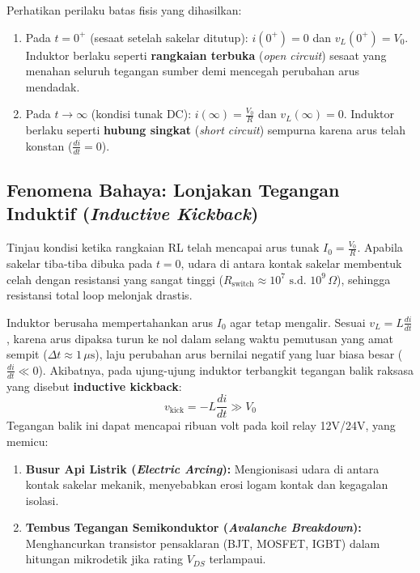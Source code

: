\documentclass[11pt,a4paper]{article}
\theoremstyle{definition}
\begin{document}
Perhatikan perilaku batas fisis yang dihasilkan:
\begin{enumerate}[leftmargin=*]
    \item Pada $t = 0^+$ (sesaat setelah sakelar ditutup): $i(0^+) = 0$ dan $v_L(0^+) = V_0$. Induktor berlaku seperti \textbf{rangkaian terbuka} (\textit{open circuit}) sesaat yang menahan seluruh tegangan sumber demi mencegah perubahan arus mendadak.
    \item Pada $t \to \infty$ (kondisi tunak DC): $i(\infty) = \frac{V_0}{R}$ dan $v_L(\infty) = 0$. Induktor berlaku seperti \textbf{hubung singkat} (\textit{short circuit}) sempurna karena arus telah konstan ($\frac{di}{dt} = 0$).
\end{enumerate}

\subsection{Fenomena Bahaya: Lonjakan Tegangan Induktif (\textit{Inductive Kickback})}

Tinjau kondisi ketika rangkaian RL telah mencapai arus tunak $I_0 = \frac{V_0}{R}$. Apabila sakelar tiba-tiba dibuka pada $t = 0$, udara di antara kontak sakelar membentuk celah dengan resistansi yang sangat tinggi ($R_{\text{switch}} \approx 10^7\text{ s.d. } 10^9\,\Omega$), sehingga resistansi total loop melonjak drastis.

Induktor berusaha mempertahankan arus $I_0$ agar tetap mengalir. Sesuai $v_L = L \frac{di}{dt}$, karena arus dipaksa turun ke nol dalam selang waktu pemutusan yang amat sempit ($\Delta t \approx 1\,\mu\text{s}$), laju perubahan arus bernilai negatif yang luar biasa besar ($\frac{di}{dt} \ll 0$). Akibatnya, pada ujung-ujung induktor terbangkit tegangan balik raksasa yang disebut \textbf{inductive kickback}:
\begin{equation}
    v_{\text{kick}} = -L \frac{di}{dt} \gg V_0
    \label{eq:inductive_kickback}
\end{equation}
Tegangan balik ini dapat mencapai ribuan volt pada koil relay 12V/24V, yang memicu:
\begin{enumerate}[leftmargin=*]
    \item \textbf{Busur Api Listrik (\textit{Electric Arcing}):} Mengionisasi udara di antara kontak sakelar mekanik, menyebabkan erosi logam kontak dan kegagalan isolasi.
    \item \textbf{Tembus Tegangan Semikonduktor (\textit{Avalanche Breakdown}):} Menghancurkan transistor pensaklaran (BJT, MOSFET, IGBT) dalam hitungan mikrodetik jika rating $V_{DS}$ terlampaui.
\end{enumerate}
\end{document}
